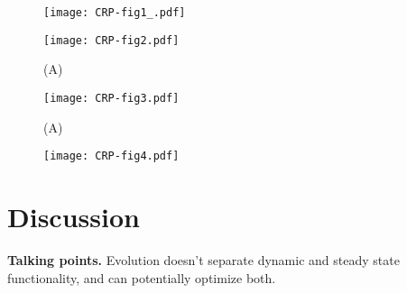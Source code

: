 \begin{figure}
	\centering
	\texttt{[image: CRP-fig1\_.pdf]}
	\clearpage %
	\label{fig:CRP:fig1-2}
\end{figure}	

\clearpage


\begin{figure}
	\centering
	\texttt{[image: CRP-fig2.pdf]}
	\caption{ 
		(A) 
	}
	\label{fig:CRP:fig2}
\end{figure}

\begin{figure}
	\centering
	\texttt{[image: CRP-fig3.pdf]}
	\caption{ 
		(A) 
	}
	\label{fig:CRP:fig3}
\end{figure}

\begin{figure}
	\centering
	\texttt{[image: CRP-fig4.pdf]}
	\clearpage %
	\label{fig:CRP:fig1-2}
\end{figure}	

\clearpage



\section{Discussion}

\textbf{Talking points.} Evolution doesn't separate dynamic and steady state functionality, and can potentially optimize both.


